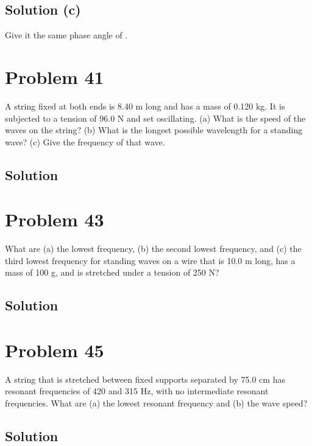 \documentclass[12pt]{article}
\begin{document}
        \subsection{Solution (c)}
            Give it the same phase angle of . 

    \section{Problem 41}
        A string fixed at both ends is 8.40 m long and has a mass of 0.120 kg. 
        It is subjected to a tension of 96.0 N and set oscillating. 
        (a) What is the speed of the waves on the string? 
        (b) What is the longest possible wavelength for a standing wave? 
        (c) Give the frequency of that wave.

        \subsection{Solution}

    \section{Problem 43}
        What are (a) the lowest frequency, (b) the second lowest frequency, and (c) the third lowest frequency for standing waves on a wire that is 10.0 m long, has a mass of 100 g, and is stretched under a tension of 250 N?

        \subsection{Solution}

    \section{Problem 45}
        A string that is stretched between fixed supports separated by 75.0 cm has resonant frequencies of 420 and 315 Hz, with no intermediate resonant frequencies. 
        What are (a) the lowest resonant frequency and (b) the wave speed?

        \subsection{Solution}

\end{document}
